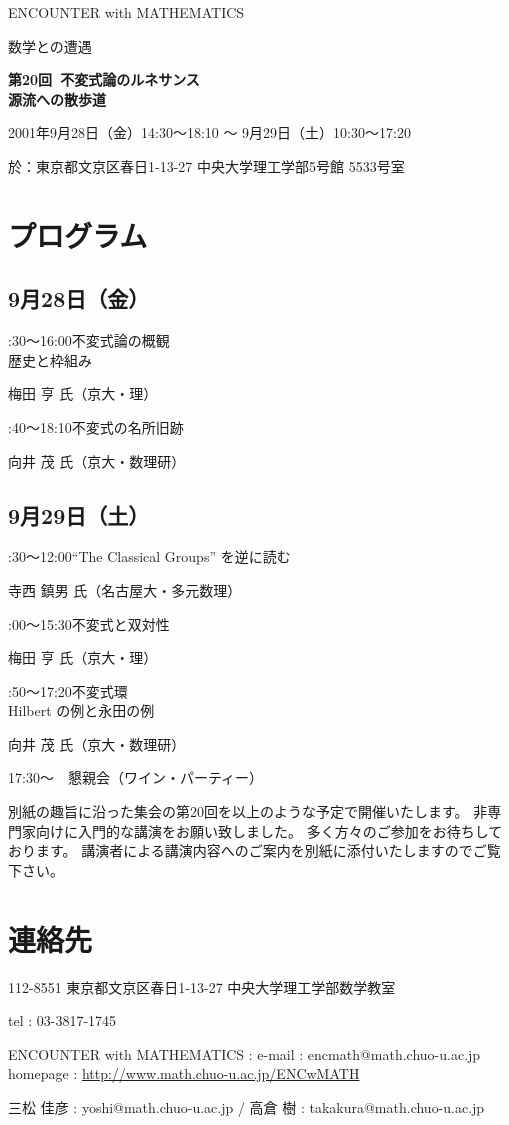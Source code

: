 \documentclass[uplatex,dvipdfmx]{jlreq}
\newcommand{\talk}[3]{%
\noindent
#1\quad #2\par
\hspace*{2em}#3\par\smallskip
}
\newcommand{\EwMnumber}{第20回}
\newcommand{\EwMtitle}{不変式論のルネサンス\\[2mm]\large 源流への散歩道}
\newcommand{\EwMdate}{2001年9月28日（金）14:30～18:10 ～ 9月29日（土）10:30～17:20}
\newcommand{\EwMplace}{東京都文京区春日1-13-27 中央大学理工学部5号館 5533号室}
\newcommand{\EwMtitleblock}{

\vspace*{-5mm}

\begin{center}

{\Large ENCOUNTER with MATHEMATICS}

\vspace{2mm}

{\large 数学との遭遇}

\vspace{4mm}

{\Large \bfseries \EwMnumber\ \EwMtitle}

\vspace{4mm}

\EwMdate

\vspace{2mm}

於：\EwMplace

\end{center}

\vspace{2mm}

}
\begin{document}
\EwMtitleblock


\section*{プログラム}

\subsection*{9月28日（金）}

\talk
{14:30～16:00}
{不変式論の概観\\[1mm]歴史と枠組み}
{梅田 亨 氏（京大・理）}

\talk
{16:40～18:10}
{不変式の名所旧跡}
{向井 茂 氏（京大・数理研）}

\subsection*{9月29日（土）}

\talk
{10:30～12:00}
{“The Classical Groups” を逆に読む}
{寺西 鎮男 氏（名古屋大・多元数理）}

\talk
{14:00～15:30}
{不変式と双対性}
{梅田 亨 氏（京大・理）}

\talk
{15:50～17:20}
{不変式環\\[1mm]Hilbert の例と永田の例}
{向井 茂 氏（京大・数理研）}

\bigskip

17:30～　懇親会（ワイン・パーティー）


\bigskip

別紙の趣旨に沿った集会の第20回を以上のような予定で開催いたします。  
非専門家向けに入門的な講演をお願い致しました。  
多く方々のご参加をお待ちしております。  
講演者による講演内容へのご案内を別紙に添付いたしますのでご覧下さい。


\section*{連絡先}

112-8551 東京都文京区春日1-13-27 中央大学理工学部数学教室 

tel : 03-3817-1745  

ENCOUNTER with MATHEMATICS : e-mail : encmath@math.chuo-u.ac.jp  
homepage : \url{http://www.math.chuo-u.ac.jp/ENCwMATH}  

三松 佳彦 : yoshi@math.chuo-u.ac.jp / 高倉 樹 : takakura@math.chuo-u.ac.jp
\end{document}

